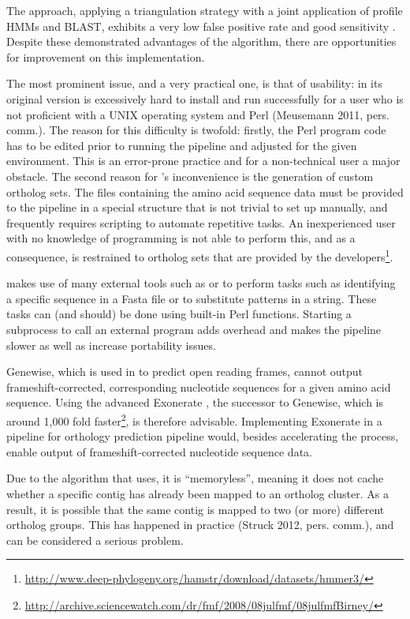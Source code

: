 \label{sec:improvements}
The \hamstr approach, applying a triangulation strategy with a joint application
of profile HMMs and BLAST, exhibits a very low false positive rate and good
sensitivity \citep{ebersberger2009}. Despite these demonstrated advantages of
the \hamstr algorithm, there are opportunities for improvement on this
implementation.

The most prominent issue, and a very practical one, is that of usability:
\hamstr in its original version is excessively hard to install and run
successfully for a user who is not proficient with a UNIX operating system and
Perl (Meusemann 2011, pers. comm.). The reason for this difficulty is twofold:
firstly, the Perl program code has to be edited prior to running the pipeline
and adjusted for the given environment. This is an error-prone practice and for
a non-technical user a major obstacle. The second reason for \hamstr's
inconvenience is the generation of custom ortholog sets. The files containing
the amino acid sequence data must be provided to the pipeline in a special
structure that is not trivial to set up manually, and frequently requires
scripting to automate repetitive tasks. An inexperienced user with no knowledge
of programming is not able to perform this, and as a consequence, is restrained
to ortholog sets that are provided by the
developers\footnote{\url{http://www.deep-phylogeny.org/hamstr/download/datasets/hmmer3/}}.

\hamstr makes use of many external tools such as  or  to
perform tasks such as identifying a specific sequence in a Fasta file or to
substitute patterns in a string. These tasks can (and should) be done using
built-in Perl functions. Starting a subprocess to call an external program adds
overhead and makes the pipeline slower as well as increase portability issues.

Genewise, which is used in \hamstr to predict open reading frames, cannot output
frameshift-corrected, corresponding nucleotide sequences for a given amino acid
sequence. Using the advanced Exonerate \citep{slater2005}, the successor to
Genewise, which is around 1,000 fold
faster\footnote{\url{http://archive.sciencewatch.com/dr/fmf/2008/08julfmf/08julfmfBirney/}},
is therefore advisable. Implementing Exonerate in a pipeline for orthology
prediction pipeline would, besides accelerating the process, enable output of
frameshift-corrected nucleotide sequence data.

Due to the algorithm that \hamstr uses, it is ``memoryless'', meaning it does
not cache whether a specific contig has already been mapped to an ortholog
cluster. As a result, it is possible that the same contig is mapped to two (or
more) different ortholog groups. This has happened in practice (Struck 2012,
pers. comm.), and can be considered a serious problem.

